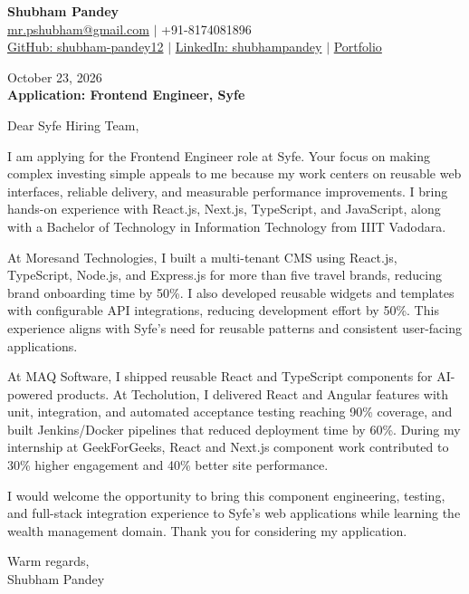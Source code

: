 \documentclass[a4paper,10pt]{article}
\begin{document}
\begin{center}
{\LARGE\textbf{Shubham Pandey}}\\[4pt]
\href{mailto:mr.pshubham@gmail.com}{mr.pshubham@gmail.com} $|$ +91-8174081896\\[2pt]
\href{https://github.com/shubham-pandey12}{GitHub: shubham-pandey12} $|$
\href{https://www.linkedin.com/in/shubham-pandey-a74716199/}{LinkedIn: shubhampandey} $|$
\href{https://shubham-portfolio-mocha.vercel.app/}{Portfolio}
\end{center}

October 23, 2026\\[4pt]
\textbf{Application: Frontend Engineer, Syfe}

\vspace{12pt}
Dear Syfe Hiring Team,

\vspace{8pt}
I am applying for the Frontend Engineer role at Syfe. Your focus on making complex investing simple appeals to me because my work centers on reusable web interfaces, reliable delivery, and measurable performance improvements. I bring hands-on experience with React.js, Next.js, TypeScript, and JavaScript, along with a Bachelor of Technology in Information Technology from IIIT Vadodara.

\vspace{8pt}
At Moresand Technologies, I built a multi-tenant CMS using React.js, TypeScript, Node.js, and Express.js for more than five travel brands, reducing brand onboarding time by 50\%. I also developed reusable widgets and templates with configurable API integrations, reducing development effort by 50\%. This experience aligns with Syfe's need for reusable patterns and consistent user-facing applications.

\vspace{8pt}
At MAQ Software, I shipped reusable React and TypeScript components for AI-powered products. At Techolution, I delivered React and Angular features with unit, integration, and automated acceptance testing reaching 90\% coverage, and built Jenkins/Docker pipelines that reduced deployment time by 60\%. During my internship at GeekForGeeks, React and Next.js component work contributed to 30\% higher engagement and 40\% better site performance.

\vspace{8pt}
I would welcome the opportunity to bring this component engineering, testing, and full-stack integration experience to Syfe's web applications while learning the wealth management domain. Thank you for considering my application.

\vspace{8pt}
Warm regards,\\
Shubham Pandey
\end{document}
